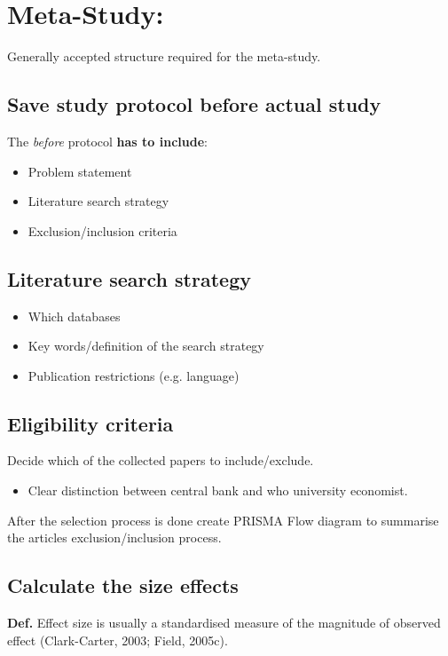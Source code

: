 \documentclass{article}
\begin{document}
\section{Meta-Study:}
Generally accepted structure required for the meta-study.

\subsection*{Save study protocol before actual study}

The \textit{before} protocol \textbf{has to include}:
\begin{itemize}
    \item Problem statement
    \item Literature search strategy
    \item Exclusion/inclusion criteria
\end{itemize}

\subsection*{Literature search strategy}

\begin{itemize}
    \item Which databases
    \item Key words/definition of the search strategy
    \item Publication restrictions (e.g. language)
\end{itemize}

\subsection*{Eligibility criteria}
Decide which of the collected papers to include/exclude. \\

\begin{itemize}
    \item Clear distinction between central bank and who university economist.
\end{itemize}

\newline \noindent
After the selection process is done create PRISMA Flow diagram to summarise the articles exclusion/inclusion process.

\subsection*{Calculate the size effects}
\textbf{Def.} Effect size is usually a standardised measure of the magnitude of observed effect (Clark-Carter, 2003; Field, 2005c).
\end{document}
